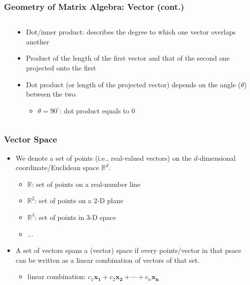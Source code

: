 \documentclass[pdflatex, 12pt]{beamer}
\newcommand{\R}{\mathbb{R}}
\begin{document}
\begin{frame}
\frametitle{Geometry of Matrix Algebra: Vector (cont.)}
\begin{columns}
\begin{column}{0.5\textwidth}
\centering
{}
\end{column}
\begin{column}{0.5\textwidth}
\begin{itemize}
\item Dot/inner product: describes the degree to which one vector overlaps another
\vspace{0.4cm}
\item Product of the length of the first vector and that of the second one projected onto the first
\vspace{0.4cm}
\item Dot product (or length of the projected vector) depends on the angle ($\theta$) between the two
 \begin{itemize}
 \item $\theta = 90^{\circ}$: dot product equals to 0 
 \end{itemize}
\end{itemize}
\end{column}
\end{columns}
\end{frame}

\begin{frame}
\frametitle{Vector Space}
\begin{itemize}
\item We denote a set of points (i.e., real-valued vectors) on the $d$-dimensional coordinate/Euclidean space $\R^d$.
 \begin{itemize}
 \item $\R$: set of points on a real-number line
 \item $\R^2$: set of points on a 2-D plane
 \item $\R^3$: set of points in 3-D space
 \item ...
 \end{itemize}
\vspace{0.4cm}
\item A set of vectors {\color{red} spans} a (vector) space if every points/vector in that psace can be written as a linear combination of vectors of that set.
 \begin{itemize}
 \item {\color{red} linear combination}: $c_1 \bm{x_1} + c_2 \bm{x_2} + \cdots + c_n \bm{x_n}$
 \end{itemize}
\end{itemize}
\end{frame}
\end{document}
